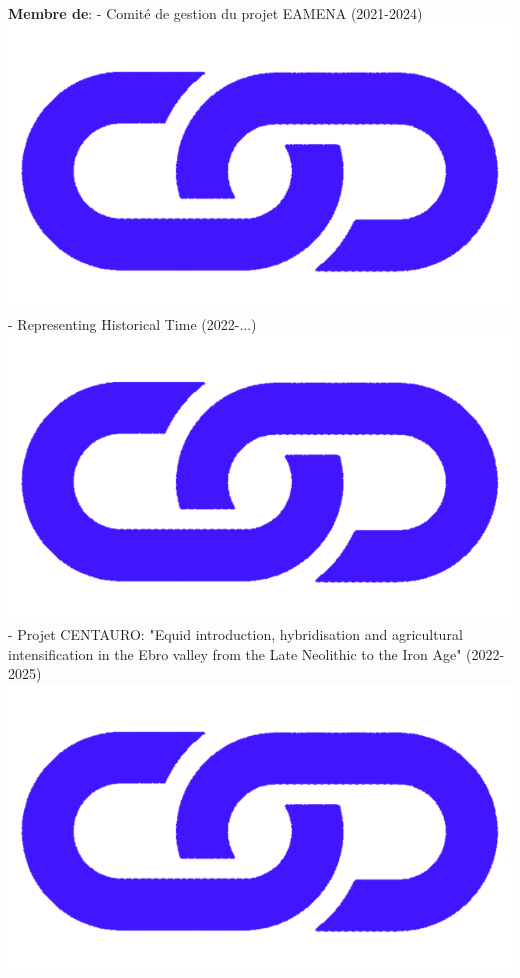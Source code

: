 \documentclass{article}
\begin{document}
\textbf{Membre de}:
\smallbreak
- Comité de gestion du projet EAMENA (2021-2024) \href{https://eamena.org/}{\includegraphics[scale=0.02]{link_darkblue.png}}\\
- Representing Historical Time (2022-...) \href{https://github.com/historical-time}{\includegraphics[scale=0.02]{link_darkblue.png}}\\
- Projet CENTAURO: "Equid introduction, hybridisation and agricultural intensification in the Ebro valley from the Late Neolithic to the Iron Age" (2022-2025) \href{https://www.centaur-o.com/}{\includegraphics[scale=0.02]{link_darkblue.png}}\\
\end{document}
